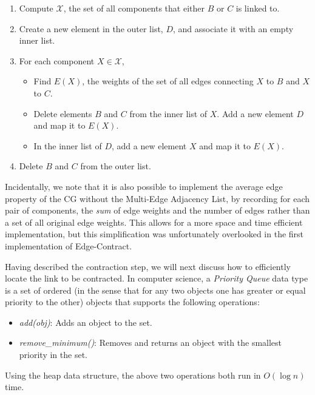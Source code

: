 \begin{enumerate}
\item
Compute $\mathcal{X}$, the set of all components that either $B$ or $C$
is linked to.

\item
Create a new element in the outer list, $D$, and associate it with an
empty inner list.

\item
For each component $X \in \mathcal{X}$,
\begin{itemize}
\item
Find $E(X)$, the weights of the set of all edges connecting $X$ to $B$
and $X$ to $C$.

\item
Delete elements $B$ and $C$ from the inner list of $X$. Add a new element
$D$ and map it to $E(X)$.

\item
In the inner list of $D$, add a new element $X$ and map it to $E(X)$.
\end{itemize}

\item
Delete $B$ and $C$ from the outer list.
\end{enumerate}

Incidentally, we note that it is also possible to implement the average
edge property of the CG without the Multi-Edge Adjacency List, by
recording for each pair of components, the \textit{sum} of edge weights
and the number of edges rather than a set of all original edge weights.
This allows for a more space and time efficient implementation, but this
simplification was unfortunately overlooked in the first implementation
of Edge-Contract.

Having described the contraction step, we will next discuss how to
efficiently locate the link to be contracted.
In computer science, a \textit{Priority Queue} data type is a set of
ordered (in the sense that for any two objects one has greater or equal
priority to the other) objects that supports the following operations:

\begin{itemize}
\item
\textit{add(obj)}: Adds an object to the set.

\item
\textit{remove\_minimum()}: Removes and returns an object with the
smallest priority in the set.
\end{itemize}

Using the heap data structure, the above two operations both run in
$O(\log n)$ time.

